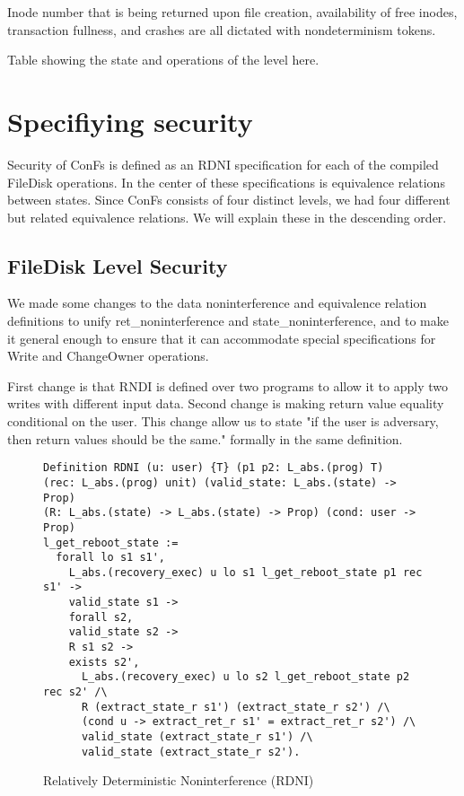 Inode number that is being returned upon file creation, availability of free inodes, transaction fullness, and crashes are all dictated with nondeterminism tokens.

{\color{red} Table showing the state and operations of the level here}.

\section{Specifiying security}
Security of ConFs is defined as an RDNI specification for each of the compiled FileDisk operations. In the center of these specifications is equivalence relations between states. Since ConFs consists of four distinct levels, we had four different but related equivalence relations. We will explain these in the descending order.

\subsection{FileDisk Level Security}
We made some changes to the data noninterference and equivalence relation definitions to unify ret\_noninterference and state\_noninterference, and to make it general enough to ensure that it can accommodate special specifications for Write and ChangeOwner operations.

First change is that RNDI is defined over two programs to allow it to apply two writes with different input data. Second change is making return value equality conditional on the user. This change allow us to state "if the user is adversary, then return values should be the same." formally in the same definition.

\begin{figure}[ht]
    \centering
\begin{verbatim}
Definition RDNI (u: user) {T} (p1 p2: L_abs.(prog) T)
(rec: L_abs.(prog) unit) (valid_state: L_abs.(state) -> Prop)
(R: L_abs.(state) -> L_abs.(state) -> Prop) (cond: user -> Prop)
l_get_reboot_state :=
  forall lo s1 s1',
    L_abs.(recovery_exec) u lo s1 l_get_reboot_state p1 rec s1' ->
    valid_state s1 ->
    forall s2,
    valid_state s2 ->
    R s1 s2 ->
    exists s2',
      L_abs.(recovery_exec) u lo s2 l_get_reboot_state p2 rec s2' /\
      R (extract_state_r s1') (extract_state_r s2') /\
      (cond u -> extract_ret_r s1' = extract_ret_r s2') /\
      valid_state (extract_state_r s1') /\
      valid_state (extract_state_r s2').
\end{verbatim}
    \caption{Relatively Deterministic Noninterference (RDNI)}
    \label{fig:RDNI}
\end{figure}

